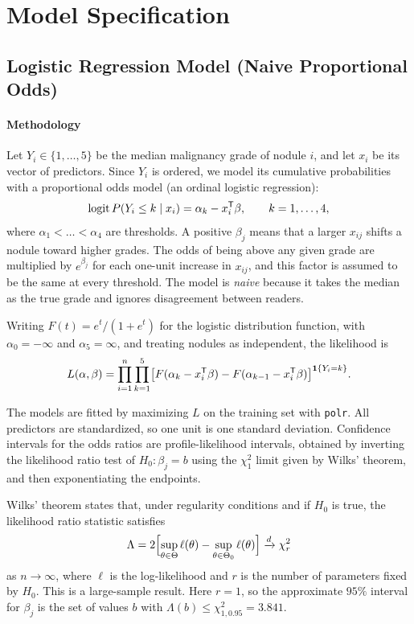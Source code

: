 \documentclass[12pt]{article}
\begin{document}
\section{Model Specification}

\subsection{Logistic Regression Model (Naive Proportional Odds)}

\paragraph{Methodology}
Let $Y_i \in \{1, \dots, 5\}$ be the median malignancy grade of nodule
$i$, and let $x_i$ be its vector of predictors. Since $Y_i$ is ordered,
we model its cumulative probabilities with a proportional odds model
(an ordinal logistic regression):
\[
  \operatorname{logit} P(Y_i \le k \mid x_i)
  = \alpha_k - x_i^{\mathsf{T}}\beta, \qquad k = 1, \dots, 4,
\]
where $\alpha_1 < \dots < \alpha_4$ are thresholds. A positive
$\beta_j$ means that a larger $x_{ij}$ shifts a nodule toward higher
grades. The odds of being above any given grade are multiplied by
$e^{\beta_j}$ for each one-unit increase in $x_{ij}$, and this factor
is assumed to be the same at every threshold. The model is
\emph{naive} because it takes the median as the true grade and ignores
disagreement between readers.

Writing $F(t) = e^t / (1 + e^t)$ for the logistic distribution
function, with $\alpha_0 = -\infty$ and $\alpha_5 = \infty$, and
treating nodules as independent, the likelihood is
\[
  L(\alpha, \beta)
  = \prod_{i=1}^{n} \prod_{k=1}^{5}
  \bigl[ F(\alpha_k - x_i^{\mathsf{T}}\beta)
  - F(\alpha_{k-1} - x_i^{\mathsf{T}}\beta) \bigr]^{\mathbf{1}\{Y_i = k\}}.
\]

The models are fitted by maximizing $L$ on the training set with
\texttt{polr}. All predictors are standardized, so one unit is
one standard deviation. Confidence intervals for the odds
ratios are profile-likelihood intervals, obtained by inverting the
likelihood ratio test of $H_0 \colon \beta_j = b$ using the
$\chi^2_1$ limit given by Wilks' theorem, and then exponentiating
the endpoints.

Wilks' theorem states that, under regularity conditions and if $H_0$
is true, the likelihood ratio statistic satisfies
\[
  \Lambda = 2\Bigl[\sup_{\theta \in \Theta} \ell(\theta)
  - \sup_{\theta \in \Theta_0} \ell(\theta)\Bigr]
  \xrightarrow{d} \chi^2_r
\]
as $n \to \infty$, where $\ell$ is the log-likelihood and $r$ is the
number of parameters fixed by $H_0$. This is a large-sample result.
Here $r = 1$, so the approximate $95\%$ interval for $\beta_j$ is the
set of values $b$ with $\Lambda(b) \le \chi^2_{1, 0.95} = 3.841$.
\end{document}
